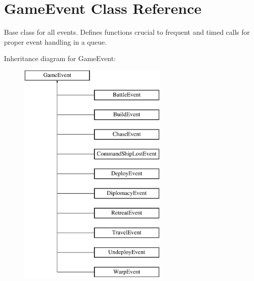 \hypertarget{class_game_event}{}\section{Game\+Event Class Reference}
\label{class_game_event}


Base class for all events. Defines functions crucial to frequent and timed calls for proper event handling in a queue.  


Inheritance diagram for Game\+Event\+:\begin{figure}[H]
\begin{center}
\leavevmode
\includegraphics[height=11.000000cm]{class_game_event}
\end{center}
\end{figure}
